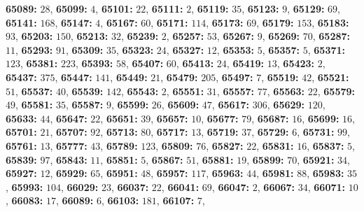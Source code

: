 \textsf{\bfseries 65089:} $28$, \textsf{\bfseries 65099:} $4$, \textsf{\bfseries 65101:} $22$, \textsf{\bfseries 65111:} $2$, \textsf{\bfseries 65119:} $35$, \textsf{\bfseries 65123:} $9$, \textsf{\bfseries 65129:} $69$, \textsf{\bfseries 65141:} $168$, \textsf{\bfseries 65147:} $4$, \textsf{\bfseries 65167:} $60$, \textsf{\bfseries 65171:} $114$, \textsf{\bfseries 65173:} $69$, \textsf{\bfseries 65179:} $153$, \textsf{\bfseries 65183:} $93$, \textsf{\bfseries 65203:} $150$, \textsf{\bfseries 65213:} $32$, \textsf{\bfseries 65239:} $2$, \textsf{\bfseries 65257:} $53$, \textsf{\bfseries 65267:} $9$, \textsf{\bfseries 65269:} $70$, \textsf{\bfseries 65287:} $11$, \textsf{\bfseries 65293:} $91$, \textsf{\bfseries 65309:} $35$, \textsf{\bfseries 65323:} $24$, \textsf{\bfseries 65327:} $12$, \textsf{\bfseries 65353:} $5$, \textsf{\bfseries 65357:} $5$, \textsf{\bfseries 65371:} $123$, \textsf{\bfseries 65381:} $223$, \textsf{\bfseries 65393:} $58$, \textsf{\bfseries 65407:} $60$, \textsf{\bfseries 65413:} $24$, \textsf{\bfseries 65419:} $13$, \textsf{\bfseries 65423:} $2$, \textsf{\bfseries 65437:} $375$, \textsf{\bfseries 65447:} $141$, \textsf{\bfseries 65449:} $21$, \textsf{\bfseries 65479:} $205$, \textsf{\bfseries 65497:} $7$, \textsf{\bfseries 65519:} $42$, \textsf{\bfseries 65521:} $51$, \textsf{\bfseries 65537:} $40$, \textsf{\bfseries 65539:} $142$, \textsf{\bfseries 65543:} $2$, \textsf{\bfseries 65551:} $31$, \textsf{\bfseries 65557:} $77$, \textsf{\bfseries 65563:} $22$, \textsf{\bfseries 65579:} $49$, \textsf{\bfseries 65581:} $35$, \textsf{\bfseries 65587:} $9$, \textsf{\bfseries 65599:} $26$, \textsf{\bfseries 65609:} $47$, \textsf{\bfseries 65617:} $306$, \textsf{\bfseries 65629:} $120$, \textsf{\bfseries 65633:} $44$, \textsf{\bfseries 65647:} $22$, \textsf{\bfseries 65651:} $39$, \textsf{\bfseries 65657:} $10$, \textsf{\bfseries 65677:} $79$, \textsf{\bfseries 65687:} $16$, \textsf{\bfseries 65699:} $16$, \textsf{\bfseries 65701:} $21$, \textsf{\bfseries 65707:} $92$, \textsf{\bfseries 65713:} $80$, \textsf{\bfseries 65717:} $13$, \textsf{\bfseries 65719:} $37$, \textsf{\bfseries 65729:} $6$, \textsf{\bfseries 65731:} $99$, \textsf{\bfseries 65761:} $13$, \textsf{\bfseries 65777:} $43$, \textsf{\bfseries 65789:} $123$, \textsf{\bfseries 65809:} $76$, \textsf{\bfseries 65827:} $22$, \textsf{\bfseries 65831:} $16$, \textsf{\bfseries 65837:} $5$, \textsf{\bfseries 65839:} $97$, \textsf{\bfseries 65843:} $11$, \textsf{\bfseries 65851:} $5$, \textsf{\bfseries 65867:} $51$, \textsf{\bfseries 65881:} $19$, \textsf{\bfseries 65899:} $70$, \textsf{\bfseries 65921:} $34$, \textsf{\bfseries 65927:} $12$, \textsf{\bfseries 65929:} $65$, \textsf{\bfseries 65951:} $48$, \textsf{\bfseries 65957:} $117$, \textsf{\bfseries 65963:} $44$, \textsf{\bfseries 65981:} $88$, \textsf{\bfseries 65983:} $35$, \textsf{\bfseries 65993:} $104$, \textsf{\bfseries 66029:} $23$, \textsf{\bfseries 66037:} $22$, \textsf{\bfseries 66041:} $69$, \textsf{\bfseries 66047:} $2$, \textsf{\bfseries 66067:} $34$, \textsf{\bfseries 66071:} $10$, \textsf{\bfseries 66083:} $17$, \textsf{\bfseries 66089:} $6$, \textsf{\bfseries 66103:} $181$, \textsf{\bfseries 66107:} $7$, 
